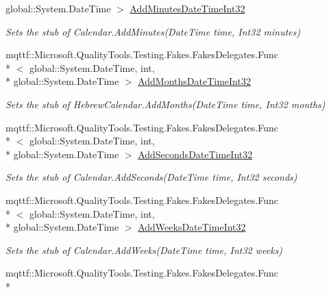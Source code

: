 \begin{DoxyCompactItemize}
global\-::\-System.\-Date\-Time $>$ \hyperlink{class_system_1_1_globalization_1_1_fakes_1_1_stub_hebrew_calendar_a6979d049e1b12e35e02b785900621d1e}{Add\-Minutes\-Date\-Time\-Int32}
\begin{DoxyCompactList}\small\item\em Sets the stub of Calendar.\-Add\-Minutes(\-Date\-Time time, Int32 minutes)\end{DoxyCompactList}\item 
mqttf\-::\-Microsoft.\-Quality\-Tools.\-Testing.\-Fakes.\-Fakes\-Delegates.\-Func\\*
$<$ global\-::\-System.\-Date\-Time, int, \\*
global\-::\-System.\-Date\-Time $>$ \hyperlink{class_system_1_1_globalization_1_1_fakes_1_1_stub_hebrew_calendar_aeb5f4affab776b2b52b211dccf48b699}{Add\-Months\-Date\-Time\-Int32}
\begin{DoxyCompactList}\small\item\em Sets the stub of Hebrew\-Calendar.\-Add\-Months(\-Date\-Time time, Int32 months)\end{DoxyCompactList}\item 
mqttf\-::\-Microsoft.\-Quality\-Tools.\-Testing.\-Fakes.\-Fakes\-Delegates.\-Func\\*
$<$ global\-::\-System.\-Date\-Time, int, \\*
global\-::\-System.\-Date\-Time $>$ \hyperlink{class_system_1_1_globalization_1_1_fakes_1_1_stub_hebrew_calendar_a0e4e585b649fd382817bc2b0212caedb}{Add\-Seconds\-Date\-Time\-Int32}
\begin{DoxyCompactList}\small\item\em Sets the stub of Calendar.\-Add\-Seconds(\-Date\-Time time, Int32 seconds)\end{DoxyCompactList}\item 
mqttf\-::\-Microsoft.\-Quality\-Tools.\-Testing.\-Fakes.\-Fakes\-Delegates.\-Func\\*
$<$ global\-::\-System.\-Date\-Time, int, \\*
global\-::\-System.\-Date\-Time $>$ \hyperlink{class_system_1_1_globalization_1_1_fakes_1_1_stub_hebrew_calendar_af19e7e964b00e501948e589cb6029e37}{Add\-Weeks\-Date\-Time\-Int32}
\begin{DoxyCompactList}\small\item\em Sets the stub of Calendar.\-Add\-Weeks(\-Date\-Time time, Int32 weeks)\end{DoxyCompactList}\item 
mqttf\-::\-Microsoft.\-Quality\-Tools.\-Testing.\-Fakes.\-Fakes\-Delegates.\-Func\\*

\end{DoxyCompactItemize}
